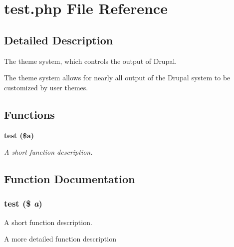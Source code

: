 \section{test.php File Reference}
\label{de/d5e/a00007}


\subsection{Detailed Description}
The theme system, which controls the output of Drupal. 

The theme system allows for nearly all output of the Drupal system to be customized by user themes. 

\subsection*{Functions}
\begin{CompactItemize}
\item 
\bf{test} (\$a)
\begin{CompactList}\small\item\em A short function description. \item\end{CompactList}\end{CompactItemize}


\subsection{Function Documentation}
\subsubsection{\setlength{\rightskip}{0pt plus 5cm}test (\$ {\em a})}\label{de/d5e/a00007_b30f595ed489ef00937e2f3954df23f1}


A short function description. 

A more detailed function description 